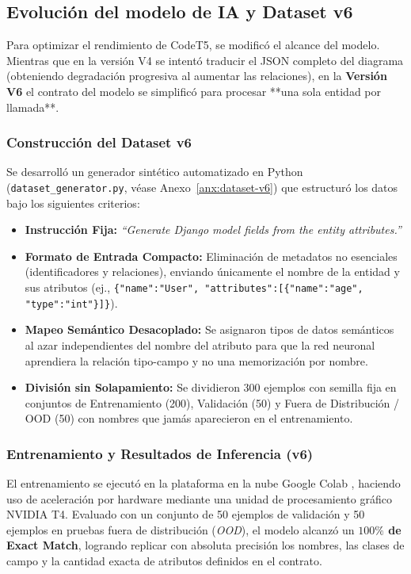 \subsection{Evolución del modelo de IA y Dataset v6}
\label{subsec:p2-dataset-v6}

Para optimizar el rendimiento de CodeT5, se modificó el alcance del modelo. Mientras que en la versión V4 se intentó traducir el JSON completo del diagrama (obteniendo degradación progresiva al aumentar las relaciones), en la \textbf{Versión V6} el contrato del modelo se simplificó para procesar **una sola entidad por llamada**.

\subsubsection{Construcción del Dataset v6}
Se desarrolló un generador sintético automatizado en Python (\texttt{dataset\_generator.py}, véase Anexo~\ref{anx:dataset-v6}) que estructuró los datos bajo los siguientes criterios:

\begin{itemize}
    \item \textbf{Instrucción Fija:} \textit{``Generate Django model fields from the entity attributes.''}
    \item \textbf{Formato de Entrada Compacto:} Eliminación de metadatos no esenciales (identificadores y relaciones), enviando únicamente el nombre de la entidad y sus atributos (ej., \texttt{\{"name":"User", "attributes":[\{"name":"age", "type":"int"\}]\}}).
    \item \textbf{Mapeo Semántico Desacoplado:} Se asignaron tipos de datos semánticos al azar independientes del nombre del atributo para que la red neuronal aprendiera la relación tipo-campo y no una memorización por nombre.
    \item \textbf{División sin Solapamiento:} Se dividieron 300 ejemplos con semilla fija en conjuntos de Entrenamiento (200), Validación (50) y Fuera de Distribución / OOD (50) con nombres que jamás aparecieron en el entrenamiento.
\end{itemize}

\subsubsection{Entrenamiento y Resultados de Inferencia (v6)}
El entrenamiento se ejecutó en la plataforma en la nube Google Colab \cite{googlecolab}, haciendo uso de aceleración por hardware mediante una unidad de procesamiento gráfico NVIDIA T4. Evaluado con un conjunto de 50 ejemplos de validación y 50 ejemplos en pruebas fuera de distribución (\textit{OOD}), el modelo alcanzó un \textbf{$100\%$ de Exact Match}, logrando replicar con absoluta precisión los nombres, las clases de campo y la cantidad exacta de atributos definidos en el contrato.

